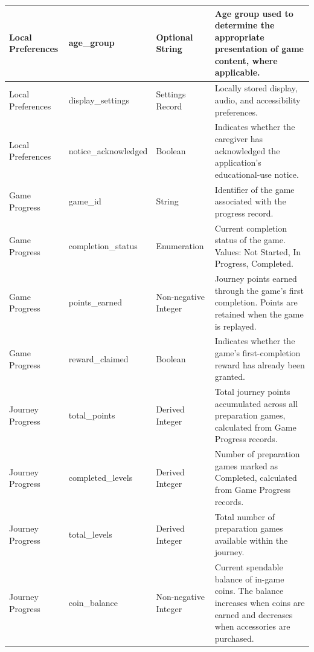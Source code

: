 \documentclass[12pt]{article}
\begin{document}
\begin{longtable}{
    p{}
    p{}
    p{}
    p{}
}
Local Preferences &
age\_group &
Optional String &
Age group used to determine the appropriate
presentation of game content, where applicable. \\
\midrule

Local Preferences &
display\_settings &
Settings Record &
Locally stored display, audio, and accessibility
preferences. \\
\midrule

Local Preferences &
notice\_acknowledged &
Boolean &
Indicates whether the caregiver has acknowledged
the application's educational-use notice. \\
\midrule

Game Progress &
game\_id &
String &
Identifier of the game associated with the
progress record. \\
\midrule

Game Progress &
completion\_status &
Enumeration &
Current completion status of the game.
Values: Not Started, In Progress, Completed. \\
\midrule

Game Progress &
points\_earned &
Non-negative Integer &
Journey points earned through the game's
first completion. Points are retained
when the game is replayed. \\
\midrule

Game Progress &
reward\_claimed &
Boolean &
Indicates whether the game's first-completion
reward has already been granted. \\
\midrule

Journey Progress &
total\_points &
Derived Integer &
Total journey points accumulated across all
preparation games, calculated from Game
Progress records. \\
\midrule

Journey Progress &
completed\_levels &
Derived Integer &
Number of preparation games marked as
Completed, calculated from Game Progress
records. \\
\midrule

Journey Progress &
total\_levels &
Derived Integer &
Total number of preparation games available
within the journey. \\
\midrule

Journey Progress &
coin\_balance &
Non-negative Integer &
Current spendable balance of in-game coins.
The balance increases when coins are earned
and decreases when accessories are purchased. \\

\bottomrule

\end{longtable}
\end{document}
